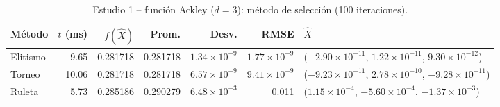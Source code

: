 \begin{table}[!t]
\centering
\scriptsize
\setlength{\tabcolsep}{2.5pt}
\caption{Estudio 1 -- funci\'on Ackley ($d=3$): m\'etodo de selecci\'on (100 iteraciones).}
\label{tab:t1a}
\begin{tabular}{lrrrrrl}
\hline
M\'etodo & $t$ (ms) & $f(\hat{X})$ & Prom. & Desv. & RMSE & $\hat{X}$ \\
\hline
Elitismo & 9.65 & 0.281718 & 0.281718 & $1.34{\times}10^{-9}$ & $1.77{\times}10^{-9}$ & ($-2.90{\times}10^{-11}$, $1.22{\times}10^{-11}$, $9.30{\times}10^{-12}$) \\
Torneo & 10.06 & 0.281718 & 0.281718 & $6.57{\times}10^{-9}$ & $9.41{\times}10^{-9}$ & ($-9.23{\times}10^{-11}$, $2.78{\times}10^{-10}$, $-9.28{\times}10^{-11}$) \\
Ruleta & 5.73 & 0.285186 & 0.290279 & $6.48{\times}10^{-3}$ & 0.011 & ($1.15{\times}10^{-4}$, $-5.60{\times}10^{-4}$, $-1.37{\times}10^{-3}$) \\
\hline
\end{tabular}
\end{table}
